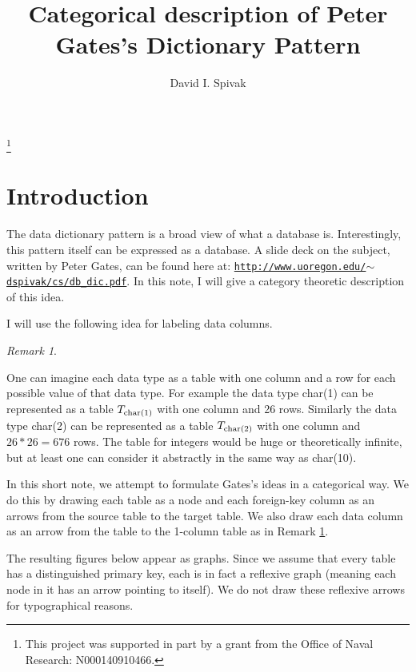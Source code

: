 \documentclass{amsart}
\def\tn{\textnormal}
\theoremstyle{remark}
\newtheorem{remark}[theorem]{Remark}
\theoremstyle{definition}
\begin{document}
\title{Categorical description of Peter Gates's Dictionary Pattern}

\author{David I. Spivak}

\thanks{This project was supported in part by a grant from the Office of Naval Research: N000140910466.}

\maketitle

\section{Introduction}

The data dictionary pattern is a broad view of what a database is.  Interestingly, this pattern itself can be expressed as a database.  A slide deck on the subject, written by Peter Gates, can be found here at: \href{http://www.uoregon.edu/~dspivak/cs/db_dic.pdf}{\tt http://www.uoregon.edu/$\sim$dspivak/cs/db\_dic.pdf}.  In this note, I will give a category theoretic description of this idea.

I will use the following idea for labeling data columns.

\begin{remark}\label{rem:1-col tables}

One can imagine each data type as a table with one column and a row for each possible value of that data type.  For example the data type char(1) can be represented as a table $T_{\tn{char(1)}}$  with one column and 26 rows.  Similarly the data type char(2) can be represented as a table $T_{\tn{char(2)}}$ with one column and $26*26=676$ rows.  The table for integers would be huge or theoretically infinite, but at least one can consider it abstractly in the same way as char(10).

\end{remark}

In this short note, we attempt to formulate Gates's ideas in a categorical way.  We do this by drawing each table as a node and each foreign-key column as an arrows from the source table to the target table.  We also draw each data column as an arrow from the table to the 1-column table as in Remark \ref{rem:1-col tables}.

The resulting figures below appear as graphs.  Since we assume that every table has a distinguished primary key, each is in fact a reflexive graph (meaning each node in it has an arrow pointing to itself).  We do not draw these reflexive arrows for typographical reasons.  
\end{document}
